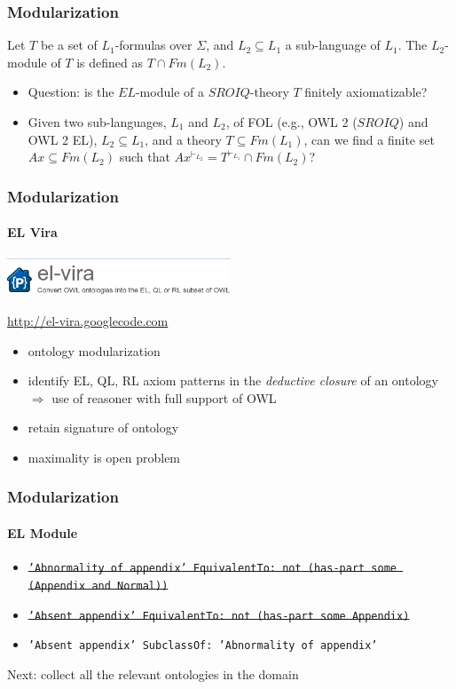 \documentclass{beamer}
\renewcommand{\em}{\itshape}
\begin{document}
\begin{frame}
  \frametitle{Modularization}
  \begin{definition}
    Let $T$ be a set of $L_1$-formulas over $\Sigma$, and
    $L_2 \subseteq L_1$ a sub-language of $L_1$. The $L_2$-module of
    $T$ is defined as $T \cap Fm(L_2)$.
  \end{definition}
  \begin{itemize}
  \item Question: is the $EL$-module of a $SROIQ$-theory $T$ finitely
    axiomatizable?
  \item Given two sub-languages, $L_1$ and $L_2$, of FOL (e.g., OWL 2
    ($SROIQ$) and OWL 2 EL), $L_2 \subseteq L_1$, and a theory
    $T \subseteq Fm(L_1)$, can we find a finite set
    $Ax \subseteq Fm(L_2)$ such that
    $Ax^{\vdash_{L_2}} = T^{\vdash_{L_1}} \cap Fm(L_2)$?
  \end{itemize}

\end{frame}

\begin{frame}
  \frametitle{Modularization}
  \framesubtitle{EL Vira}
  \centerline{\includegraphics[width=0.5\textwidth]{elvira.png}}
  \url{http://el-vira.googlecode.com}
  \begin{itemize}
  \item ontology modularization 
  \item identify EL, QL, RL axiom patterns in the {\em deductive
      closure} of an ontology $\Rightarrow$ use of reasoner with full support of OWL
  \item retain signature of ontology
  \item maximality is open problem
  \end{itemize}
\end{frame}

\begin{frame}
  \frametitle{Modularization}
  \framesubtitle{EL Module}
  {\tiny
  \begin{itemize}
  \item \sout{{\tt 'Abnormality of appendix' EquivalentTo: not (has-part some (Appendix
    and Normal))}}
  \item \sout{{\tt 'Absent appendix' EquivalentTo: not (has-part some Appendix)}}
  \end{itemize}
  \begin{itemize}
  \item {\tt 'Absent appendix' SubclassOf: 'Abnormality of appendix'}
  \end{itemize}
}
\pause
\vspace{2cm}
Next: collect all the relevant ontologies in the domain
\end{frame}
\end{document}
